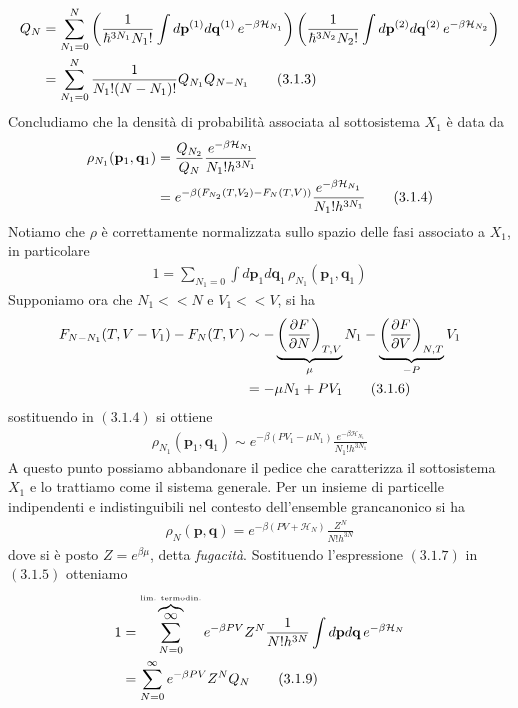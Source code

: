 \documentclass{article}
\begin{document}
\begin{align}
    Q_N &= \sum_{N_1 = 0}^N \left(\frac{1}{\hbar^{3N_1}N_1!}\int d\mathbf{p}^{(1)}d\mathbf{q}^{(1)} \, e^{-\beta\mathcal{H}_{N_1}}\right)\left(\frac{1}{\hbar^{3N_2}N_2!}\int d\mathbf{p}^{(2)}d\mathbf{q}^{(2)} \, e^{-\beta\mathcal{H}_{N_2}}\right) \notag \\
    &= \sum_{N_1 = 0}^N \frac{1}{N_1!(N - N_1)!}Q_{N_1}Q_{N - N_1} \tag{3.1.3}
\end{align}
Concludiamo che la densità di probabilità associata al sottosistema $X_1$ è data da
\begin{align}
    \rho_{N_1}(\mathbf{p}_1, \mathbf{q}_1) &= \frac{Q_{N_2}}{Q_N}\frac{e^{-\beta\mathcal{H}_{N_1}}}{N_1!h^{3N_1}} \notag \\
    &= e^{-\beta(F_{N_2}(T, V_2) - F_N(T, V))}\frac{e^{-\beta\mathcal{H}_{N_1}}}{N_1!h^{3N_1}} \tag{3.1.4}
\end{align}
Notiamo che $\rho$ è correttamente normalizzata sullo spazio delle fasi associato a $X_1$, in particolare 
\begin{align}
    1 = \sum_{N_1 = 0}\int d\mathbf{p}_1d\mathbf{q}_1 \, \rho_{N_1}(\mathbf{p}_1, \mathbf{q}_1) \tag{3.1.5}
\end{align}
Supponiamo ora che $N_1 << N$ e $V_1 << V$, si ha 
\begin{align}
    F_{N - N_1}(T, V - V_1) - F_N(T, V) &\sim -\underbrace{\left(\frac{\partial F}{\partial N}\right)_{T, V}}_{\mu}N_1 - \underbrace{\left(\frac{\partial F}{\partial V}\right)_{N, T}}_{-P}V_1 \notag \\
    &= -\mu N_1 + PV_1 \tag{3.1.6}
\end{align}
sostituendo in $(3.1.4)$ si ottiene 
\begin{align}
    \rho_{N_1}(\mathbf{p}_1, \mathbf{q}_1) \sim e^{-\beta(PV_1 -\mu N_1)}\frac{e^{-\beta \mathcal{H}_{N_1}}}{N_1!h^{3N_1}} \tag{3.1.7}
\end{align}
A questo punto possiamo abbandonare il pedice che caratterizza il sottosistema $X_1$ e lo trattiamo come il sistema generale. Per un insieme di particelle indipendenti e indistinguibili nel contesto dell'ensemble grancanonico si ha
\begin{align}
    \rho_N(\mathbf{p}, \mathbf{q}) = e^{-\beta(PV + \mathcal{H}_N)}\frac{Z^N}{N!h^{3N}} \tag{3.1.8}
\end{align}
dove si è posto $Z = e^{\beta\mu}$, detta \textit{fugacità}. Sostituendo l'espressione $(3.1.7)$ in $(3.1.5)$ otteniamo 
\begin{align}
    1 &= \sum_{N = 0}^{\overbrace{\infty}^{\text{lim. termodin.}}}e^{-\beta PV}Z^N\frac{1}{N!h^{3N}}\int d\mathbf{p}d\mathbf{q} \, e^{-\beta\mathcal{H}_N} \notag \\
    &= \sum_{N = 0}^\infty e^{-\beta PV}Z^NQ_N \tag{3.1.9}
\end{align}
\end{document}
